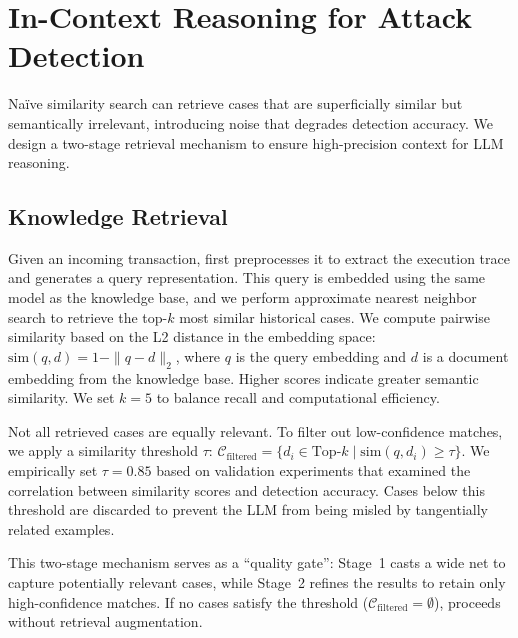 \section{In-Context Reasoning for Attack Detection}
\label{sec:retrieval}

Na\"ive similarity search can retrieve cases that are superficially similar but semantically irrelevant, introducing noise that degrades detection accuracy. We design a two-stage retrieval mechanism to ensure high-precision context for LLM reasoning.

\subsection{Knowledge Retrieval}

Given an incoming transaction, \approach{} first preprocesses it to extract the execution trace and generates a query representation. This query is embedded using the same model as the knowledge base, and we perform approximate nearest neighbor search to retrieve the top-$k$ most similar historical cases. We compute pairwise similarity based on the L2 distance in the embedding space: $\text{sim}(q, d) = 1 - \|q - d\|_2$,
where $q$ is the query embedding and $d$ is a document embedding from the knowledge base. Higher scores indicate greater semantic similarity. We set $k = 5$ to balance recall and computational efficiency.


Not all retrieved cases are equally relevant. To filter out low-confidence matches, we apply a similarity threshold $\tau$:
$\mathcal{C}_{\text{filtered}} = \{d_i \in \text{Top-}k \mid \text{sim}(q, d_i) \geq \tau\}$.
We empirically set $\tau = 0.85$ based on validation experiments that examined the correlation between similarity scores and detection accuracy. Cases below this threshold are discarded to prevent the LLM from being misled by tangentially related examples.

This two-stage mechanism serves as a ``quality gate'': Stage~1 casts a wide net to capture potentially relevant cases, while Stage~2 refines the results to retain only high-confidence matches. If no cases satisfy the threshold ($\mathcal{C}_{\text{filtered}} = \emptyset$), \approach{} proceeds without retrieval augmentation.

